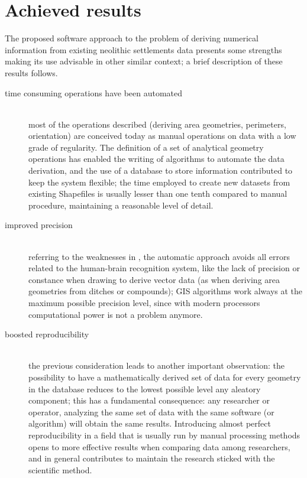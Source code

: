             \vfill

        \section{Achieved results}
            The proposed software approach to the problem of deriving numerical information from existing neolithic settlements data presents some strengths making its use advisable in other similar context; a brief description of these results follows.

            \begin{description}
                \item[time consuming operations have been automated]\hfill\\most of the operations described (deriving area geometries, perimeters, orientation) are conceived today as manual operations on data with a low grade of regularity. The definition of a set of analytical geometry operations has enabled the writing of algorithms to automate the data derivation, and the use of a database to store information contributed to keep the system flexible; the time employed to create new datasets from existing Shapefiles is usually lesser than one tenth compared to manual procedure, maintaining a reasonable level of detail.
                \item[improved precision]\hfill\\referring to the weaknesses in , the automatic approach avoids all errors related to the human-brain recognition system, like the lack of precision or constance when drawing to derive vector data (as when deriving area geometries from ditches or compounds); GIS algorithms work always at the maximum possible precision level, since with modern processors computational power is not a problem anymore.
                \item[boosted reproducibility]\hfill\\the previous consideration leads to another important observation: the possibility to have a mathematically derived set of data for every geometry in the database reduces to the lowest possible level any aleatory component; this has a fundamental consequence: any researcher or operator, analyzing the same set of data with the same software (or algorithm) will obtain the same results. Introducing almost perfect reproducibility in a field that is usually run by manual processing methods opens to more effective results when comparing data among researchers, and in general contributes to maintain the research sticked with the scientific method.

\end{description}
